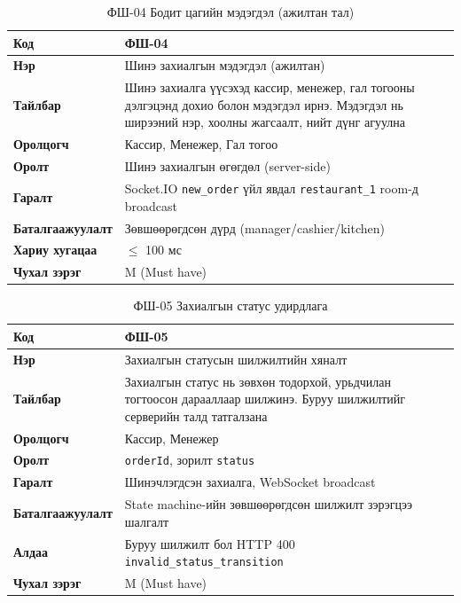 \begin{table}[htbp]
\caption{ФШ-04 Бодит цагийн мэдэгдэл (ажилтан тал)}
\label{tab:fr04}
\centering
\small
\begin{tabularx}{\textwidth}{|l|L|}
\hline
{}
\textbf{Код} & ФШ-04 \\ \hline
\textbf{Нэр} & Шинэ захиалгын мэдэгдэл (ажилтан) \\ \hline
{}
\textbf{Тайлбар} & Шинэ захиалга үүсэхэд кассир, менежер, гал тогооны дэлгэцэнд дохио болон мэдэгдэл ирнэ. Мэдэгдэл нь ширээний нэр, хоолны жагсаалт, нийт дүнг агуулна \\ \hline
\textbf{Оролцогч} & Кассир, Менежер, Гал тогоо \\ \hline
{}
\textbf{Оролт} & Шинэ захиалгын өгөгдөл (server-side) \\ \hline
\textbf{Гаралт} & Socket.IO \texttt{new\_order} үйл явдал \texttt{restaurant\_1} room-д broadcast \\ \hline
{}
\textbf{Баталгаажуулалт} & Зөвшөөрөгдсөн дүрд (manager/cashier/kitchen) \\ \hline
\textbf{Хариу хугацаа} & $\leq$ 100 мс \\ \hline
{}
\textbf{Чухал зэрэг} & M (Must have) \\ \hline
\end{tabularx}
\end{table}

\begin{table}[htbp]
\caption{ФШ-05 Захиалгын статус удирдлага}
\label{tab:fr05}
\centering
\small
\begin{tabularx}{\textwidth}{|l|L|}
\hline
{}
\textbf{Код} & ФШ-05 \\ \hline
\textbf{Нэр} & Захиалгын статусын шилжилтийн хяналт \\ \hline
{}
\textbf{Тайлбар} & Захиалгын статус нь зөвхөн тодорхой, урьдчилан тогтоосон дарааллаар шилжинэ. Буруу шилжилтийг серверийн талд татгалзана \\ \hline
\textbf{Оролцогч} & Кассир, Менежер \\ \hline
{}
\textbf{Оролт} & \texttt{orderId}, зорилт \texttt{status} \\ \hline
\textbf{Гаралт} & Шинэчлэгдсэн захиалга, WebSocket broadcast \\ \hline
{}
\textbf{Баталгаажуулалт} & State machine-ийн зөвшөөрөгдсөн шилжилт зэрэгцээ шалгалт \\ \hline
\textbf{Алдаа} & Буруу шилжилт бол HTTP 400 \texttt{invalid\_status\_transition} \\ \hline
{}
\textbf{Чухал зэрэг} & M (Must have) \\ \hline
\end{tabularx}
\end{table}

